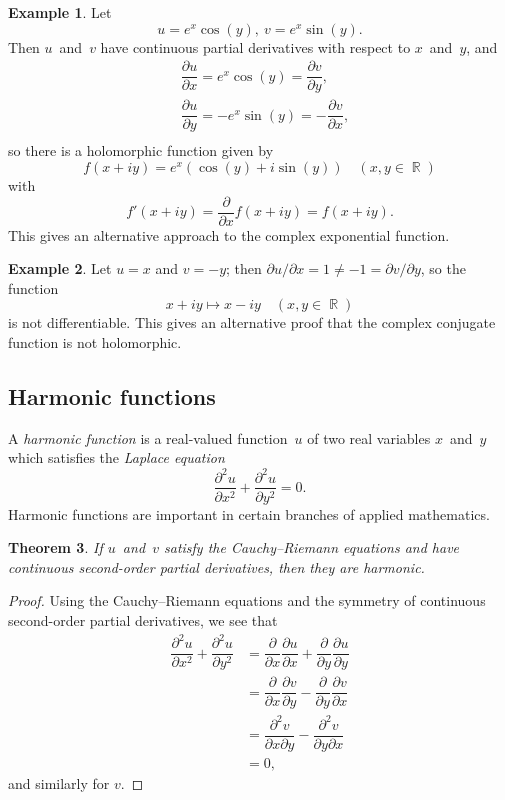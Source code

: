 \documentclass{amsproc}
\newtheorem{theorem}{Theorem}[subsection]
\theoremstyle{definition}
\newtheorem{example}[theorem]{Example}
\theoremstyle{remark}
\renewcommand{\d}{\partial}
\DeclareMathOperator{\R}{\mathbb{R}}
\numberwithin{equation}{section}
\begin{document}
\begin{example} \label{CME4.2}
Let
$$
u = e^x\cos(y),\ v = e^x\sin(y).
$$
Then $ u $~and~$ v $ have continuous partial derivatives with respect to $ x $~and~$ y $, and
\begin{align*}
&\dfrac{\d u}{\d x} = e^x\cos(y) = \dfrac{\d v}{\d y}, \\
&\dfrac{\d u}{\d y} = -e^x\sin(y) = -\dfrac{\d v}{\d x}, \\
\end{align*}
so there is a holomorphic function given by
$$
f(x + iy) = e^x(\cos(y) + i\sin(y)) \quad (x,y\in\R)
$$
with
$$
f'(x + iy) = \dfrac{\d}{\d x} f(x + iy) = f(x + iy).
$$
This gives an alternative approach to the complex exponential function.
\end{example}

\begin{example} \label{CME4.3}
Let $ u = x $ and $ v = -y $; then $ \d u/\d x = 1 \neq -1 = \d v/\d y $, so the function
$$
x + iy \mapsto x - iy \quad (x,y\in\R)
$$
is not differentiable. This gives an alternative proof that the complex conjugate function is not holomorphic.
\end{example}

\vfill\pagebreak


\subsection{Harmonic functions} \label{CMS5}

A \emph{harmonic function} is a real-valued function~$ u $ of two real variables $ x $~and~$ y $ which satisfies the \emph{Laplace equation}
$$
\dfrac{\d^2 u}{\d x^2} + \dfrac{\d^2 u}{\d y^2} = 0.
$$
Harmonic functions are important in certain branches of applied mathematics.

\begin{theorem} \label{CMT5.1}
If $ u $~and~$ v $ satisfy the Cauchy--Riemann equations and have continuous second-order partial derivatives, then they are harmonic.
\end{theorem}

\begin{proof}
Using the Cauchy--Riemann equations and the symmetry of continuous second-order partial derivatives, we see that
\begin{align*}
\dfrac{\d^2 u}{\d x^2} + \dfrac{\d^2 u}{\d y^2} &= \dfrac{\d}{\d x}\dfrac{\d u}{\d x}+\dfrac{\d}{\d y}\dfrac{\d u}{\d y} \\
&= \dfrac{\d}{\d x}\dfrac{\d v}{\d y} - \dfrac{\d}{\d y}\dfrac{\d v}{\d x} \\
&= \dfrac{\d^2 v}{\d x\d y} - \dfrac{\d^2 v}{\d y\d x} \\
&= 0,
\end{align*}
and similarly for $ v $.
\end{proof}
\end{document}
